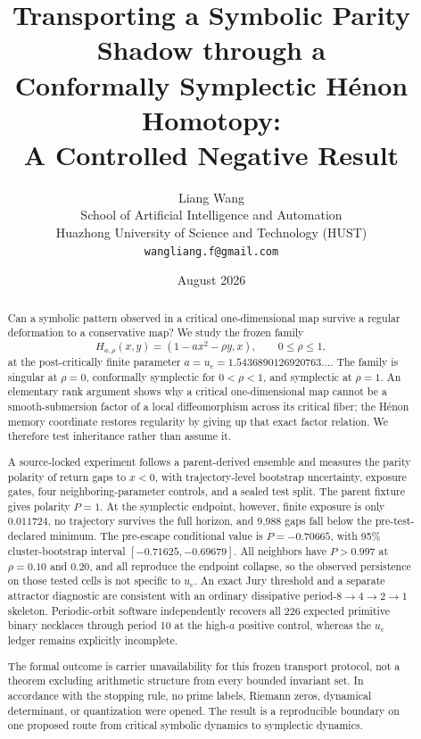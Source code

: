 \documentclass[11pt]{article}
\title{\textbf{Transporting a Symbolic Parity Shadow through a\\
Conformally Symplectic H\'enon Homotopy:\\
A Controlled Negative Result}}
\author{
 Liang Wang\\
 School of Artificial Intelligence and Automation\\
 Huazhong University of Science and Technology (HUST)\\
 \texttt{wangliang.f@gmail.com}
}
\date{August 2026}
\newcommand{\uc}{u_{\mathrm c}}
\begin{document}
\maketitle

\begin{abstract}
Can a symbolic pattern observed in a critical one-dimensional map survive a
regular deformation to a conservative map? We study the frozen family
\[
H_{a,\rho}(x,y)=(1-a x^2-\rho y,x),\qquad 0\leq\rho\leq1,
\]
at the post-critically finite parameter
\(a=\uc=1.5436890126920763\ldots\). The family is singular at \(\rho=0\),
conformally symplectic for \(0<\rho<1\), and symplectic at \(\rho=1\).
An elementary rank argument shows why a critical one-dimensional map cannot be
a smooth-submersion factor of a local diffeomorphism across its critical
fiber; the H\'enon memory coordinate restores regularity by giving up that
exact factor relation. We therefore test inheritance rather than assume it.

A source-locked experiment follows a parent-derived ensemble and measures the
parity polarity of return gaps to \(x<0\), with trajectory-level bootstrap
uncertainty, exposure gates, four neighboring-parameter controls, and a sealed
test split. The parent fixture gives polarity \(P=1\). At the symplectic
endpoint, however, finite exposure is only \(0.011724\), no trajectory survives
the full horizon, and 9,988 gaps fall below the pre-test-declared minimum. The
pre-escape conditional value is \(P=-0.70665\), with 95\% cluster-bootstrap
interval \([-0.71625,-0.69679]\). All neighbors have \(P>0.997\) at
\(\rho=0.10\) and \(0.20\), and all reproduce the endpoint collapse, so the
observed persistence on those tested cells is not specific to \(\uc\). An
exact Jury threshold and a separate attractor diagnostic are consistent with
an ordinary dissipative period-\(8\to4\to2\to1\) skeleton. Periodic-orbit
software independently recovers all 226 expected
primitive binary necklaces through period 10 at the high-\(a\) positive
control, whereas the \(\uc\) ledger remains explicitly incomplete.

The formal outcome is carrier unavailability for this frozen transport
protocol, not a theorem excluding arithmetic structure from every bounded
invariant set. In accordance with the stopping rule, no prime labels,
Riemann zeros, dynamical determinant, or quantization were opened. The result
is a reproducible boundary on one proposed route from critical symbolic
dynamics to symplectic dynamics.
\end{abstract}
\end{document}
